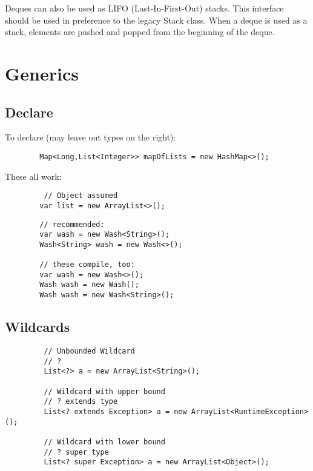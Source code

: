 \documentclass{scrartcl}
\begin{document}
    \bigskip

    Deques can also be used as LIFO (Last-In-First-Out) stacks. This interface should be used in preference to the legacy Stack class. When a deque is used as a stack, elements are pushed and popped from the beginning of the deque.


\section{Generics}
\subsection{Declare}

     To declare (may leave out types on the right):

    \begin{lstlisting}
        Map<Long,List<Integer>> mapOfLists = new HashMap<>();
    \end{lstlisting}

    These all work:

    \begin{lstlisting}
         // Object assumed
        var list = new ArrayList<>();
    \end{lstlisting}

    \begin{lstlisting}
        // recommended:
        var wash = new Wash<String>();
        Wash<String> wash = new Wash<>();

        // these compile, too:
        var wash = new Wash<>();
        Wash wash = new Wash();
        Wash wash = new Wash<String>();

    \end{lstlisting}



\subsection{Wildcards}

    \begin{lstlisting}
         // Unbounded Wildcard
         //	?
         List<?> a = new ArrayList<String>();

         // Wildcard with upper bound
         // ? extends type
         List<? extends Exception> a = new ArrayList<RuntimeException>();

         // Wildcard with lower bound
         //	? super type
         List<? super Exception> a = new ArrayList<Object>();
    \end{lstlisting}
\end{document}
